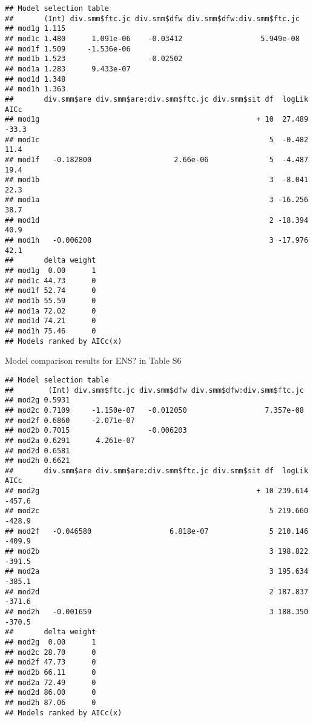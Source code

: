 \documentclass[]{article}
\begin{document}
\begin{verbatim}
## Model selection table 
##       (Int) div.smm$ftc.jc div.smm$dfw div.smm$dfw:div.smm$ftc.jc
## mod1g 1.115                                                      
## mod1c 1.480      1.091e-06    -0.03412                  5.949e-08
## mod1f 1.509     -1.536e-06                                       
## mod1b 1.523                   -0.02502                           
## mod1a 1.283      9.433e-07                                       
## mod1d 1.348                                                      
## mod1h 1.363                                                      
##       div.smm$are div.smm$are:div.smm$ftc.jc div.smm$sit df  logLik  AICc
## mod1g                                                  + 10  27.489 -33.3
## mod1c                                                     5  -0.482  11.4
## mod1f   -0.182800                   2.66e-06              5  -4.487  19.4
## mod1b                                                     3  -8.041  22.3
## mod1a                                                     3 -16.256  38.7
## mod1d                                                     2 -18.394  40.9
## mod1h   -0.006208                                         3 -17.976  42.1
##       delta weight
## mod1g  0.00      1
## mod1c 44.73      0
## mod1f 52.74      0
## mod1b 55.59      0
## mod1a 72.02      0
## mod1d 74.21      0
## mod1h 75.46      0
## Models ranked by AICc(x)
\end{verbatim}

Model comparison results for ENS? in Table S6

\begin{verbatim}
## Model selection table 
##        (Int) div.smm$ftc.jc div.smm$dfw div.smm$dfw:div.smm$ftc.jc
## mod2g 0.5931                                                      
## mod2c 0.7109     -1.150e-07   -0.012050                  7.357e-08
## mod2f 0.6860     -2.071e-07                                       
## mod2b 0.7015                  -0.006203                           
## mod2a 0.6291      4.261e-07                                       
## mod2d 0.6581                                                      
## mod2h 0.6621                                                      
##       div.smm$are div.smm$are:div.smm$ftc.jc div.smm$sit df  logLik   AICc
## mod2g                                                  + 10 239.614 -457.6
## mod2c                                                     5 219.660 -428.9
## mod2f   -0.046580                  6.818e-07              5 210.146 -409.9
## mod2b                                                     3 198.822 -391.5
## mod2a                                                     3 195.634 -385.1
## mod2d                                                     2 187.837 -371.6
## mod2h   -0.001659                                         3 188.350 -370.5
##       delta weight
## mod2g  0.00      1
## mod2c 28.70      0
## mod2f 47.73      0
## mod2b 66.11      0
## mod2a 72.49      0
## mod2d 86.00      0
## mod2h 87.06      0
## Models ranked by AICc(x)
\end{verbatim}
\end{document}
